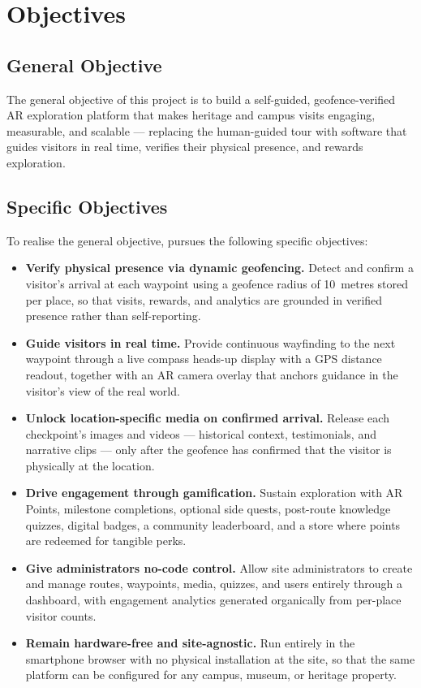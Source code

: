 \chapter{Objectives}
\label{ch:objectives}

\section{General Objective}
The general objective of this project is to build a self-guided,
geofence-verified AR exploration platform that makes heritage and campus
visits engaging, measurable, and scalable --- replacing the human-guided
tour with software that guides visitors in real time, verifies their
physical presence, and rewards exploration.

\section{Specific Objectives}
To realise the general objective, \projectname{} pursues the following
specific objectives:

\begin{itemize}
  \item \textbf{Verify physical presence via dynamic geofencing.} Detect and
        confirm a visitor's arrival at each waypoint using a geofence radius
        of 10~metres stored per place, so that visits, rewards, and
        analytics are grounded in verified presence rather than
        self-reporting.
  \item \textbf{Guide visitors in real time.} Provide continuous wayfinding
        to the next waypoint through a live compass heads-up display with a
        GPS distance readout, together with an AR camera overlay that
        anchors guidance in the visitor's view of the real world.
  \item \textbf{Unlock location-specific media on confirmed arrival.}
        Release each checkpoint's images and videos --- historical context,
        testimonials, and narrative clips --- only after the geofence has
        confirmed that the visitor is physically at the location.
  \item \textbf{Drive engagement through gamification.} Sustain exploration
        with AR Points, milestone completions, optional side quests,
        post-route knowledge quizzes, digital badges, a community
        leaderboard, and a store where points are redeemed for tangible
        perks.
  \item \textbf{Give administrators no-code control.} Allow site
        administrators to create and manage routes, waypoints, media,
        quizzes, and users entirely through a dashboard, with engagement
        analytics generated organically from per-place visitor counts.
  \item \textbf{Remain hardware-free and site-agnostic.} Run entirely in the
        smartphone browser with no physical installation at the site, so
        that the same platform can be configured for any campus, museum, or
        heritage property.
\end{itemize}
